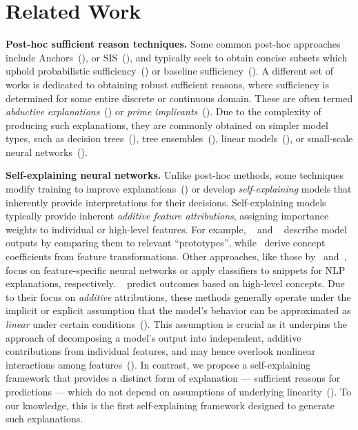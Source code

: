 \section{Related Work}

\textbf{Post-hoc sufficient reason techniques.} Some common post-hoc approaches include Anchors~(\cite{ribeiro2018anchors}), or SIS~(\cite{carter2019made}), and typically seek to obtain concise subsets which uphold probabilistic sufficiency~(\cite{wang2021probabilistic, ribeiro2018anchors, blanc2021provably}) or baseline sufficiency~(\cite{hase2021out, chockler2021explanations, deyoung2019eraser}). A different set of works is dedicated to obtaining robust sufficient reasons, where sufficiency is determined for some entire discrete or continuous domain. These are often termed \emph{abductive explanations}~(\cite{ignatiev2019abduction, bassan2023formally}) or \emph{prime implicants}~(\cite{ignatiev2019abduction, shih2018symbolic}). Due to the complexity of producing such explanations, they are commonly obtained on simpler model types, such as decision trees~(\cite{izza2020explaining}), tree ensembles~(\cite{izza2021explaining, ignatiev2022using}), linear models~(\cite{marques2020explaining}), or small-scale neural networks~(\cite{ignatiev2019abduction, la2021guaranteed, bassan2023towards}).

\textbf{Self-explaining neural networks.} Unlike post-hoc methods, some techniques modify training to improve explanations~(\cite{ismail2021improving, chen2019robust, hase2021out, vafa2021rationales, yan2023self}) or develop \emph{self-explaining} models that inherently provide interpretations for their decisions. Self-explaining models typically provide inherent \emph{additive feature attributions}, assigning importance weights to individual or high-level features. For example, ~\cite{chen2019looks} and ~\cite{wang2021self} describe model outputs by comparing them to relevant ``prototypes'', while~\cite{alvarez2018towards} derive concept coefficients from feature transformations. Other approaches, like those by~\cite{agarwal2021neural} and~\cite{jain2020learning}, focus on feature-specific neural networks or apply classifiers to snippets for NLP explanations, respectively. ~\cite{koh2020concept} predict outcomes based on high-level concepts. Due to their focus on \emph{additive} attributions, these methods generally operate under the implicit or explicit assumption that the model's behavior can be approximated as \emph{linear} under certain conditions~(\cite{yeh2019fidelity, lundberg2017unified}). This assumption is crucial as it underpins the approach of decomposing a model’s output into independent, additive contributions from individual features, and may hence overlook nonlinear interactions among features~(\cite{slack2020fooling, ribeiro2018anchors, yeh2019fidelity}). In contrast, we propose a self-explaining framework that provides a distinct form of explanation --- sufficient reasons for predictions --- which do not depend on assumptions of underlying linearity~(\cite{ribeiro2018anchors}). To our knowledge, this is the first self-explaining framework designed to generate such explanations.




